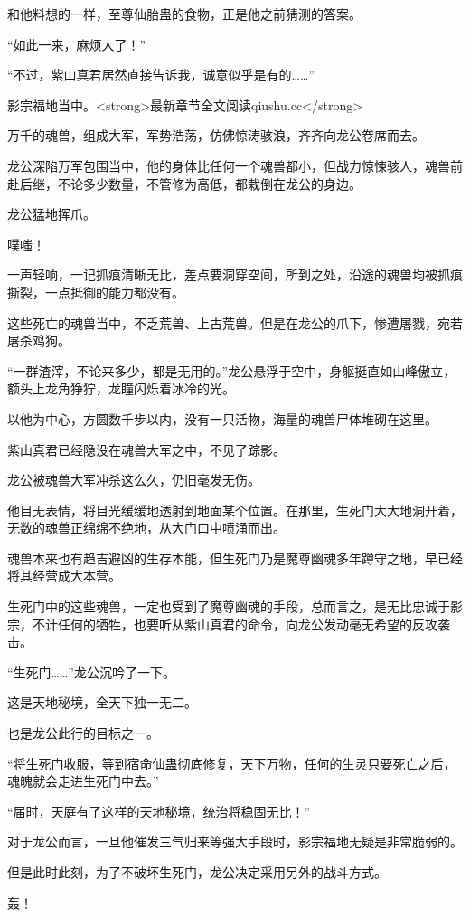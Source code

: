 \begin{this_body}
和他料想的一样，至尊仙胎蛊的食物，正是他之前猜测的答案。

“如此一来，麻烦大了！”

“不过，紫山真君居然直接告诉我，诚意似乎是有的……”

影宗福地当中。<strong>最新章节全文阅读qiushu.cc</strong>

万千的魂兽，组成大军，军势浩荡，仿佛惊涛骇浪，齐齐向龙公卷席而去。

龙公深陷万军包围当中，他的身体比任何一个魂兽都小，但战力惊悚骇人，魂兽前赴后继，不论多少数量，不管修为高低，都栽倒在龙公的身边。

龙公猛地挥爪。

噗嗤！

一声轻响，一记抓痕清晰无比，差点要洞穿空间，所到之处，沿途的魂兽均被抓痕撕裂，一点抵御的能力都没有。

这些死亡的魂兽当中，不乏荒兽、上古荒兽。但是在龙公的爪下，惨遭屠戮，宛若屠杀鸡狗。

“一群渣滓，不论来多少，都是无用的。”龙公悬浮于空中，身躯挺直如山峰傲立，额头上龙角狰狞，龙瞳闪烁着冰冷的光。

以他为中心，方圆数千步以内，没有一只活物，海量的魂兽尸体堆砌在这里。

紫山真君已经隐没在魂兽大军之中，不见了踪影。

龙公被魂兽大军冲杀这么久，仍旧毫发无伤。

他目无表情，将目光缓缓地透射到地面某个位置。在那里，生死门大大地洞开着，无数的魂兽正绵绵不绝地，从大门口中喷涌而出。

魂兽本来也有趋吉避凶的生存本能，但生死门乃是魔尊幽魂多年蹲守之地，早已经将其经营成大本营。

生死门中的这些魂兽，一定也受到了魔尊幽魂的手段，总而言之，是无比忠诚于影宗，不计任何的牺牲，也要听从紫山真君的命令，向龙公发动毫无希望的反攻袭击。

“生死门……”龙公沉吟了一下。

这是天地秘境，全天下独一无二。

也是龙公此行的目标之一。

“将生死门收服，等到宿命仙蛊彻底修复，天下万物，任何的生灵只要死亡之后，魂魄就会走进生死门中去。”

“届时，天庭有了这样的天地秘境，统治将稳固无比！”

对于龙公而言，一旦他催发三气归来等强大手段时，影宗福地无疑是非常脆弱的。

但是此时此刻，为了不破坏生死门，龙公决定采用另外的战斗方式。

轰！


\end{this_body}
